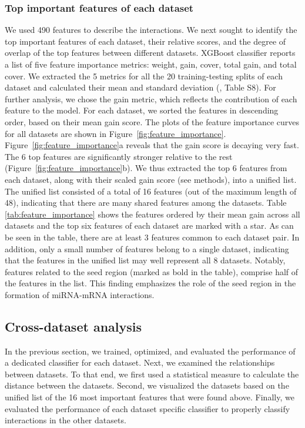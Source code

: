 \documentclass{bmcart}
\begin{document}
\subsubsection*{Top important features of each dataset}
We used 490 features to describe the interactions. We next sought to identify the top important features of each dataset, their relative scores, and the degree of overlap of the top features between different datasets. XGBoost classifier reports a list of five feature importance metrics: weight, gain, cover, total gain, and total cover. We extracted the 5 metrics for all the 20 training-testing splits of each dataset and calculated their mean and standard deviation (, Table S8).
For further analysis, we chose the gain metric, which reflects the contribution of each feature to the model. For each dataset, we sorted the features in descending order, based on their mean gain score. The plots of the feature importance curves for all datasets are shown in Figure~\ref{fig:feature_importance}.
Figure~\ref{fig:feature_importance}a reveals that the gain score is decaying very fast. The 6 top features are significantly stronger relative to the rest (Figure~\ref{fig:feature_importance}b). We thus extracted the top 6 features from each dataset, along with their scaled gain score (see methods), into a unified list. The unified list consisted of a total of 16 features (out of the maximum length of 48), indicating that there are many shared features among the datasets. Table \ref{tab:feature_importance} shows the features ordered by their mean gain across all datasets and the top six features of each dataset are marked with a star. As can be seen in the table, there are at least 3 features common to each dataset pair. In addition, only a small number of features belong to a single dataset, indicating that the features in the unified list may well represent all 8 datasets.
Notably, features related to the seed region (marked as bold in the table), comprise half of the features in the list. This finding emphasizes the role of the seed region in the formation of miRNA-mRNA interactions.



\subsection*{Cross-dataset analysis}
In the previous section, we trained, optimized, and evaluated the performance of a dedicated classifier for each dataset. Next, we examined the relationships between datasets. To that end, we first used a statistical measure to calculate the distance between the datasets. Second, we visualized the datasets based on the unified list of the 16 most important features that were found above. Finally, we evaluated the performance of each dataset specific classifier to properly classify interactions in the other datasets.
\end{document}
